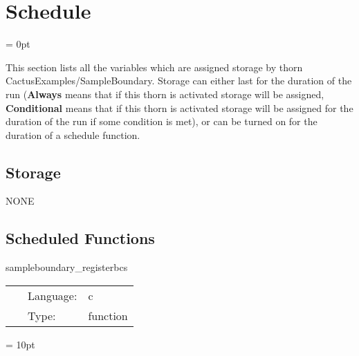 
\section{Schedule} 


\parskip = 0pt


\noindent This section lists all the variables which are assigned storage by thorn CactusExamples/SampleBoundary.  Storage can either last for the duration of the run ({\bf Always} means that if this thorn is activated storage will be assigned, {\bf Conditional} means that if this thorn is activated storage will be assigned for the duration of the run if some condition is met), or can be turned on for the duration of a schedule function.


\subsection*{Storage}NONE
\subsection*{Scheduled Functions}
\vspace{5mm}


\hspace{5mm} sampleboundary\_registerbcs 

\hspace{5mm}{\it register boundary conditions that this thorn provides } 


\hspace{5mm}

 \begin{tabular*}{160mm}{cll} 
~ & Language:  & c \\ 
~ & Type:  & function \\ 
\end{tabular*} 



\vspace{5mm}\parskip = 10pt 
